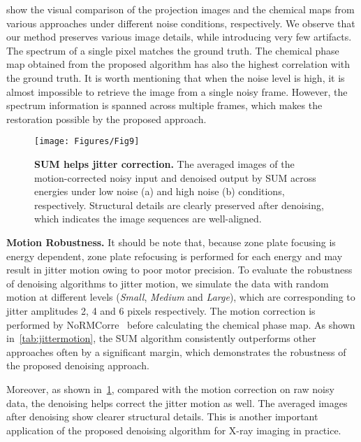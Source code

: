 \documentclass[10pt,twocolumn,letterpaper]{article}
\begin{document}
 show the visual comparison of the projection images and the chemical maps from various approaches under different noise conditions, respectively. We observe that our method preserves various image details, while introducing very few artifacts. The spectrum of a single pixel matches the ground truth. The chemical phase map obtained from the proposed algorithm has also the highest correlation with the ground truth. It is worth mentioning that when the noise level is high, it is almost impossible to retrieve the image from a single noisy frame. However, the spectrum information is spanned across multiple frames, which makes the restoration possible by the proposed approach.

\begin{figure}
  \centering
   \vspace{-5pt}
    \texttt{[image: Figures/Fig9]}
    \vspace{-5pt}
    \caption{\textbf{SUM helps jitter correction.} The averaged images of the motion-corrected noisy input and denoised output by SUM across energies under low noise (a) and high noise (b) conditions, respectively. Structural details are clearly preserved after denoising, which indicates the image sequences are well-aligned.}
    \vspace{-15pt}
    \label{fig9}
\end{figure} 

\textbf{Motion Robustness.} It should be note that, because zone plate focusing is energy dependent, zone plate refocusing is performed for each energy and may result in jitter motion owing to poor motor precision. To evaluate the robustness of denoising algorithms to jitter motion, we simulate the data with random motion at different levels (\textit{Small}, \textit{Medium} and \textit{Large}), which are corresponding to jitter amplitudes 2, 4 and 6 pixels respectively. The motion correction is performed by NoRMCorre~\cite{pnevmatikakis2017normcorre} before calculating the chemical phase map. As shown in~\cref{tab:jittermotion}, the SUM algorithm consistently outperforms other approaches often by a significant margin, which demonstrates the robustness of the proposed denoising approach. 

Moreover, as shown in~\cref{fig9}, compared with the motion correction on raw noisy data, the denoising helps correct the jitter motion as well. The averaged images after denoising show clearer structural details. This is another important application of the proposed denoising algorithm for X-ray imaging in practice. 
\end{document}
